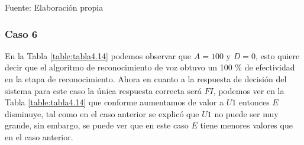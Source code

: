 \begin{center}
\begin{table}[H]
\centering
\caption{\small{Resultados para obtener U1 en el caso 5.}}
\label{table:tabla4.13}
\vskip 0.2cm
\begin{center}
\vskip 0.2cm
{\small{Fuente: Elaboración propia}}
\end{center}
\end{table}
\end{center}

\subsubsection{Caso 6}
En la Tabla \ref{table:tabla4.14} podemos observar que $A = 100$ y $D = 0$, esto quiere decir que el algoritmo de reconocimiento de voz obtuvo un 100 \% de efectividad en la etapa de reconocimiento.
\vskip 0.5cm
Ahora en cuanto a la respuesta de decisión del sistema para este caso la única respuesta correcta será $FI$, podemos ver en la Tabla \ref{table:tabla4.14} que conforme aumentamos de valor a $U1$ entonces $E$ disminuye, tal como en el caso anterior se explicó que $U1$ no puede ser muy grande, sin embargo, se puede ver que en este caso $E$ tiene menores valores que en el caso anterior.

